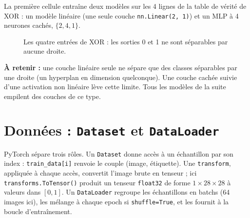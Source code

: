 La première cellule entraîne deux modèles sur les 4 lignes de la table de vérité de XOR : un modèle linéaire (une seule couche \texttt{nn.Linear(2, 1)}) et un MLP à 4 neurones cachés, $\{2, 4, 1\}$. \\

\begin{figure}[H]
\centering

\caption{Les quatre entrées de XOR : les sorties 0 et 1 ne sont séparables par aucune droite.}
\label{fig:tp3-xor}
\end{figure}



\begin{imp}
\textbf{À retenir :} une couche linéaire seule ne sépare que des classes séparables par une droite (un hyperplan en dimension quelconque). Une couche cachée suivie d'une activation non linéaire lève cette limite. Tous les modèles de la suite empilent des couches de ce type.
\end{imp}

\section{Données : \texttt{Dataset} et \texttt{DataLoader}}

PyTorch sépare trois rôles. Un \texttt{Dataset} donne accès à un échantillon par son index : \texttt{train\_data[i]} renvoie le couple (image, étiquette). Une \texttt{transform}, appliquée à chaque accès, convertit l'image brute en tenseur ; ici \texttt{transforms.ToTensor()} produit un tenseur \texttt{float32} de forme $1 \times 28 \times 28$ à valeurs dans $[0, 1]$. Un \texttt{DataLoader} regroupe les échantillons en batchs (64 images ici), les mélange à chaque epoch si \texttt{shuffle=True}, et les fournit à la boucle d'entraînement. \\



